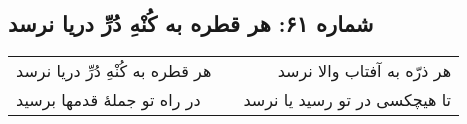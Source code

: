 \begin{center}
\section*{شماره ۶۱: هر قطره به کُنْهِ دُرِّ دریا نرسد}
\label{sec:061}
\begin{longtable}{l p{0.5cm} r}
هر قطره به کُنْهِ دُرِّ دریا نرسد
&&
هر ذرّه به آفتاب والا نرسد
\\
در راه تو جملهٔ قدمها برسید
&&
تا هیچکسی در تو رسید یا نرسد
\\
\end{longtable}
\end{center}
